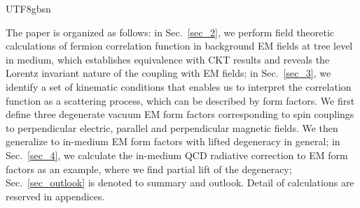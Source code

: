 \documentclass[11pt]{article}\def\baselinestretch{1.4}
\begin{document}
\begin{CJK}{UTF8}{gbsn}



The paper is organized as follows: in Sec.~\ref{sec_2}, we perform field theoretic calculations of fermion correlation function in background EM fields at tree level in medium, which establishes equivalence with CKT results and reveals the Lorentz invariant nature of the coupling with EM fields; in Sec.~\ref{sec_3}, we identify a set of kinematic conditions that enables us to interpret the correlation function as a scattering process, which can be described by form factors. We first define three degenerate vacuum EM form factors corresponding to spin couplings to perpendicular electric, parallel and perpendicular magnetic fields. We then generalize to in-medium EM form factors with lifted degeneracy in general; in Sec.~\ref{sec_4}, we calculate the in-medium QCD radiative correction to EM form factors as an example, where we find partial lift of the degeneracy; Sec.~\ref{sec_outlook} is denoted to summary and outlook. Detail of calculations are reserved in appendices.



\end{CJK}
\end{document}
